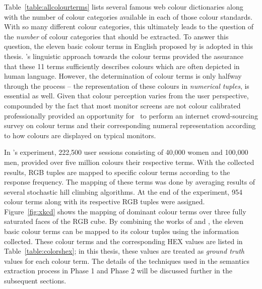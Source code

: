 Table~\ref{table:allcolourterms} lists several famous web colour dictionaries along with the number of colour categories available in each of those colour standards. With so many different colour categories, this ultimately leads to the question of the \emph{number} of colour categories that should be extracted.
To answer this question, the eleven basic colour terms in English proposed by \cite{berlinandkay} is adopted in this thesis.
's linguistic approach towards the colour terms provided the assurance that these 11 terms sufficiently describes colours which are often depicted in human language.
However, the determination of colour terms is only halfway through the process -- the representation of these colours in \textit{numerical tuples}, is essential as well.
Given that colour perception varies from the user perspective, compounded by the fact that most monitor screens are not colour calibrated professionally provided an opportunity for~ to perform an internet crowd-sourcing survey on colour terms and their corresponding numeral representation according to how colours are displayed on typical monitors.

In 's experiment, 222,500 user sessions consisting of 40,000 women and 100,000 men, provided over five million colours their respective terms. With the collected results, RGB tuples are mapped to specific colour terms according to the response frequency.
The mapping of these terms was done by averaging results of several stochastic hill climbing algorithms. At the end of the experiment, 954 colour terms along with its respective RGB tuples were assigned.
Figure~\ref{fig:xkcd} shows the mapping of dominant colour terms over three fully saturated faces of the RGB cube.
By combining the works of  and , the eleven basic colour terms can be mapped to its colour tuples using the information collected. These colour terms and the corresponding HEX values are listed in Table~\ref{table:colorshex}; in this thesis, these values are treated as \textit{ground truth} values for each colour term.
The details of the techniques used in the semantics extraction process in Phase 1 and Phase 2 will be discussed further in the subsequent sections.

